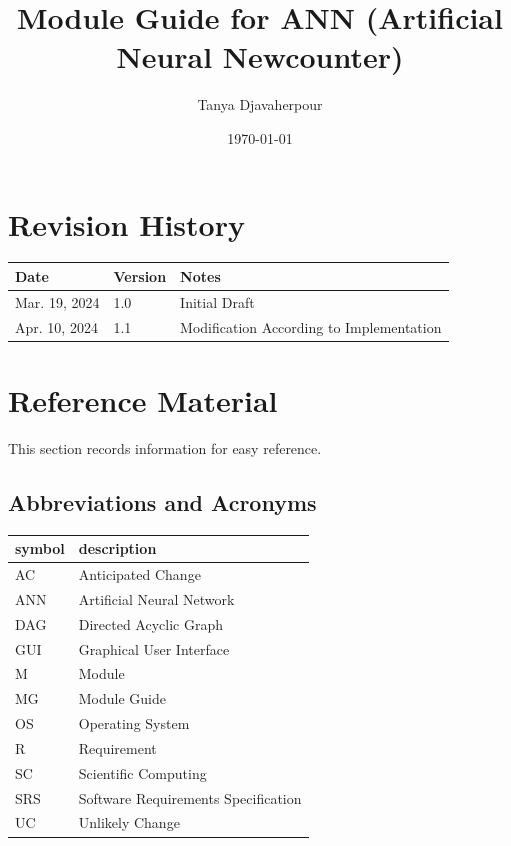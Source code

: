 \documentclass[12pt, titlepage]{article}
\begin{document}
\title{Module Guide for ANN (Artificial Neural Newcounter)} 
\author{Tanya Djavaherpour}
\date{\today}

\maketitle


\section{Revision History}

\begin{tabularx}{\textwidth}{p{3cm}p{2cm}X}
\toprule {\bf Date} & {\bf Version} & {\bf Notes}\\
\midrule
Mar. 19, 2024 & 1.0 & Initial Draft\\
Apr. 10, 2024 & 1.1 & Modification According to Implementation\\
\bottomrule
\end{tabularx}

\newpage

\section{Reference Material}

This section records information for easy reference.

\subsection{Abbreviations and Acronyms}

\renewcommand{\arraystretch}{1.2}
\begin{tabular}{l l} 
  \toprule		
  \textbf{symbol} & \textbf{description}\\
  \midrule 
  AC & Anticipated Change\\
  ANN & Artificial Neural Network\\
  DAG & Directed Acyclic Graph \\
  GUI & Graphical User Interface\\
  M & Module \\
  MG & Module Guide \\
  OS & Operating System \\
  R & Requirement\\
  SC & Scientific Computing \\
  SRS & Software Requirements Specification\\
  UC & Unlikely Change \\
  \bottomrule
\end{tabular}\\
\end{document}
